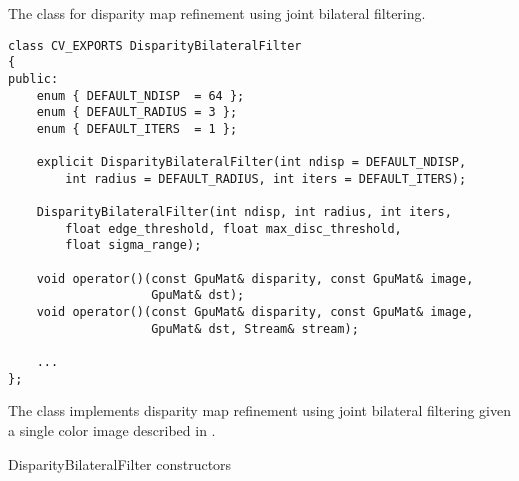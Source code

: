 \begin{description}
\end{description}


The class for disparity map refinement using joint bilateral filtering.

\begin{lstlisting}
class CV_EXPORTS DisparityBilateralFilter
{
public:
    enum { DEFAULT_NDISP  = 64 };
    enum { DEFAULT_RADIUS = 3 };
    enum { DEFAULT_ITERS  = 1 };

    explicit DisparityBilateralFilter(int ndisp = DEFAULT_NDISP, 
        int radius = DEFAULT_RADIUS, int iters = DEFAULT_ITERS);

    DisparityBilateralFilter(int ndisp, int radius, int iters, 
        float edge_threshold, float max_disc_threshold, 
        float sigma_range);

    void operator()(const GpuMat& disparity, const GpuMat& image, 
                    GpuMat& dst);
    void operator()(const GpuMat& disparity, const GpuMat& image, 
                    GpuMat& dst, Stream& stream);

    ...
};
\end{lstlisting}

The class implements disparity map refinement using joint bilateral filtering given a single color image described in \cite{qx_csbp}.


DisparityBilateralFilter constructors


